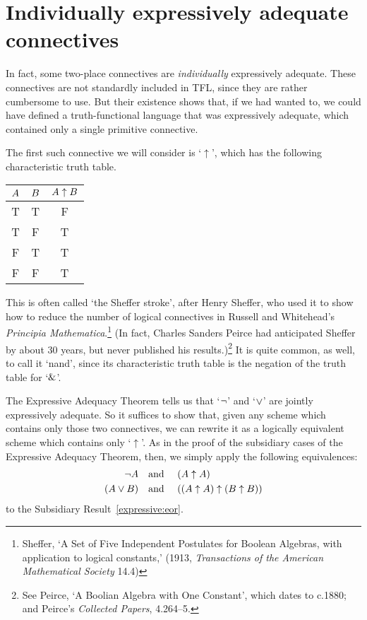 \section{Individually expressively adequate connectives}

In fact, some two-place connectives are \emph{individually} expressively adequate. These connectives are not standardly included in TFL, since they are rather cumbersome to use. But their existence shows that, if we had wanted to, we could have defined a truth-functional language that was expressively adequate, which contained only a single primitive connective.

The first such connective we will consider is `$\uparrow$', which has the following characteristic truth table.
\begin{center}
\begin{tabular}{c c | c}
$A$ & $B$ & $A \mathrel{\uparrow} B$\\
\hline
 T & T & F \\
 T & F & T \\
 F & T & T  \\
 F & F & T
\end{tabular}
\end{center}
 This is often called `the Sheffer stroke', after Henry Sheffer, who used it to show how to reduce the number of logical connectives in Russell and Whitehead's \emph{Principia Mathematica}.\footnote{Sheffer, `A Set of Five Independent Postulates for Boolean Algebras, with application to logical constants,' (1913, \emph{Transactions of the American Mathematical Society} 14.4)} (In fact, Charles Sanders Peirce had anticipated Sheffer by about 30 years, but never published his results.)\footnote{See Peirce, `A Boolian Algebra with One Constant', which dates to c.1880; and Peirce's \emph{Collected Papers}, 4.264--5.} It is quite common, as well, to call it `nand', since its characteristic truth table is the negation of the truth table for `$\mathbin{\&}$'.

The Expressive Adequacy Theorem tells us that `$\neg$' and `$\vee$' are jointly expressively adequate. So it suffices to show that, given any scheme which contains only those two connectives, we can rewrite it as a logically equivalent scheme which contains only `$\uparrow$'. As in the proof of the subsidiary cases of the Expressive Adequacy Theorem, then, we simply apply the following equivalences:
		\begin{align*}
			\neg A &\text{\quad and \quad} (A \uparrow A)\\
			(A \vee B) & \text{\quad and \quad} ((A \uparrow A) \uparrow (B \uparrow B))
		\end{align*}
to the Subsidiary Result~\ref{expressive:eor}.

